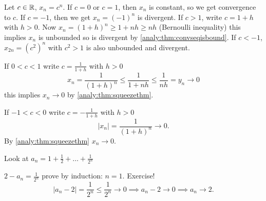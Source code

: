 \documentclass[10pt, a4paper]{article}
\begin{document}
\begin{example}
    Let $c \in \mathbb{R}$, $x_n = c ^ n$.
    If $c = 0$ or $c = 1$,
    then $x_n$ is constant,
    so we get convergence to $c$.
    If $c = -1$,
    then we get $x_n = (-1) ^ n$ is divergent.
    If $c > 1$,
    write $c = 1 + h$ with $h > 0$.
    Now $x_n = (1 + h) ^ n \geq 1 + nh \geq nh$ (Bernoulli inequality)
    this implies $x_n$ is unbounded so is divergent by \autoref{analy:thm:convseqisbound}.
    If $c < -1$,
    $x_{2n} = (c ^ 2) ^ n$ with $c ^ 2 > 1$ is also unbounded and divergent.

    If $0 < c < 1$ write $c = \frac{1}{1 + h}$ with $h > 0$
    \[
    x_n = \frac{1}{(1 + h) ^ n} \leq \frac{1}{1 + nh} \leq \frac{1}{nh} = y_n \to 0
    \]
    this implies $x_n \to 0$ by \autoref{analy:thm:squeezethm}.

    If $-1 < c < 0$ write $c = -\frac{1}{1 + h}$ with $h > 0$
    \[
    |x_n| = \frac{1}{(1 + h) ^ n} \to 0.
    \]
    By \autoref{analy:thm:squeezethm} $x_n \to 0$.
\end{example}

\begin{example}
    Look at $a_n = 1 + \frac{1}{2} + \dotsc + \frac{1}{2 ^ n}$

    $2 - a_n = \frac{1}{2 ^ n}$ prove by induction: $n = 1$.
    Exercise!
    \[
    |a_n - 2| = \frac{1}{2 ^ n} \leq \frac{1}{2 ^ n} \to 0 \implies a_n - 2 \to 0 \implies a_n \to 2.
    \]
\end{example}
\end{document}
